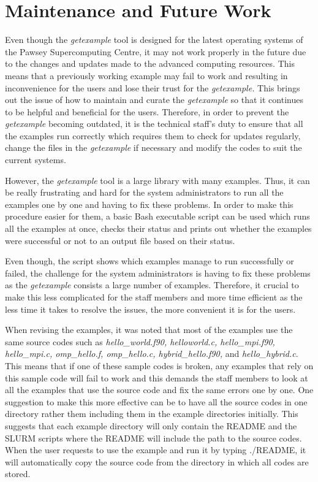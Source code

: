 \section{Maintenance and Future Work}

Even though the \emph{getexample} tool is designed for the latest operating systems of the Pawsey Supercomputing Centre, it may not work properly in the future
due to the changes and updates made to the advanced computing resources. This means that a previously working example may fail to work and resulting in 
inconvenience for the users and lose their trust for the \emph{getexample.} This brings out the issue of how to maintain and curate the \emph{getexample} so that it 
continues to be helpful and beneficial for the users. Therefore, in order to prevent the \emph{getexample} becoming outdated, it is the technical staff's duty 
to ensure that all the examples run correctly which requires them to check for updates regularly, change the files in the \emph{getexample} if necessary and 
modify the codes to suit the current systems.

However, the \emph{getexample} tool is a large library with many examples. Thus, it can be really frustrating and hard for the system administrators to run 
all the examples one by one and having to fix these problems. In order to make this procedure easier for them, a basic Bash executable script can be 
used which runs all the examples at once, checks their status and prints out whether the examples were successful or not to an output file based on their
status.

Even though, the script shows which examples manage to run successfully or failed, the challenge for the system administrators is having to fix 
these problems as the \emph{getexample} consists a large number of examples. Therefore, it crucial to make this less complicated for the staff members and more
time efficient as the less time it takes to resolve the issues, the more convenient it is for the users. 

When revising the examples, it was noted that most of the examples use the same source codes such as \emph{hello\_world.f90, helloworld.c, 
hello\_mpi.f90, hello\_mpi.c, omp\_hello.f, omp\_hello.c, hybrid\_hello.f90,} and \emph{hello\_hybrid.c}. This means that if one of these sample codes is
broken, any examples that rely on this sample code will fail to work and this demands the staff members to look at all the examples that use the source
code and fix the same errors one by one. One suggestion to make this more effective can be to have all the source codes in one directory rather them
including them in the example directories initially. This suggests that each example directory will only contain the README and the SLURM scripts where
the README will include the path to the source codes. When the user requests to use the example and run it by typing ./README, it will automatically
copy the source code from the directory in which all codes are stored.


